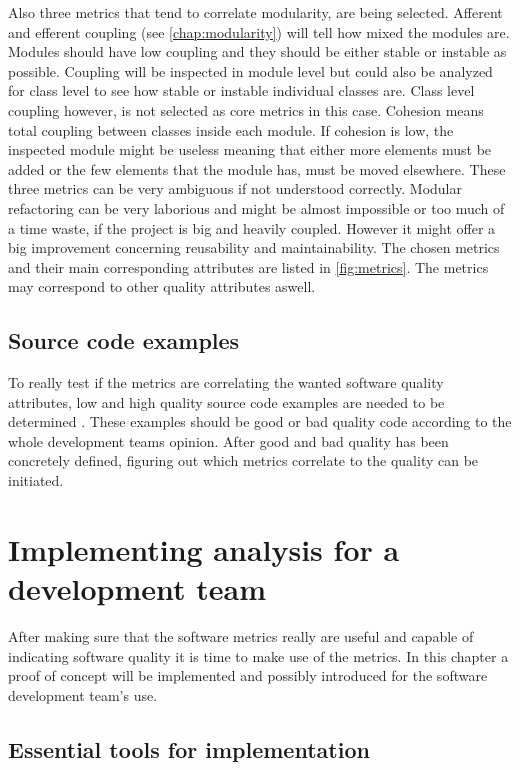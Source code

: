 Also three metrics that tend to correlate modularity, are being selected. Afferent and efferent coupling (see \autoref{chap:modularity}) will tell how mixed the modules are. Modules should have low coupling and they should be either stable or instable as possible. Coupling will be inspected in module level but could also be analyzed for class level to see how stable or instable individual classes are. Class level coupling however, is not selected as core metrics in this case. Cohesion means total coupling between classes inside each module. If cohesion is low, the inspected module might be useless meaning that either more elements must be added or the few elements that the module has, must be moved elsewhere. These three metrics can be very ambiguous if not understood correctly. Modular refactoring can be very laborious and might be almost impossible or too much of a time waste, if the project is big and heavily coupled. However it might offer a big improvement concerning reusability and maintainability. The chosen metrics and their main corresponding attributes are listed in \autoref{fig:metrics}. The metrics may correspond to other quality attributes aswell. 

\section{Source code examples}
To really test if the metrics are correlating the wanted software quality attributes, low and high quality source code examples are needed to be determined \cite{coleman1994using}. These examples should be good or bad quality code according to the whole development teams opinion. After good and bad quality has been concretely defined, figuring out which metrics correlate to the quality can be initiated. 




\chapter{Implementing analysis for a development team}

After making sure that the software metrics really are useful and capable of indicating software quality it is time to make use of the metrics. In this chapter a proof of concept will be implemented and possibly introduced for the software development team's use.

\section{Essential tools for implementation}

